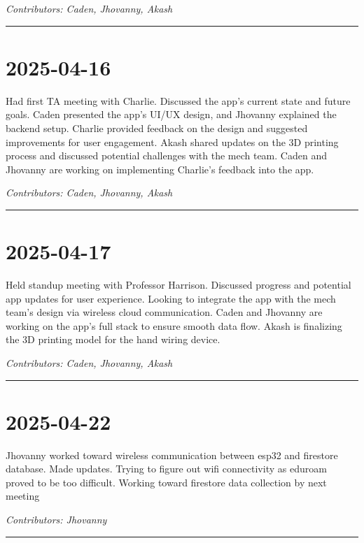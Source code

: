 \documentclass[12pt]{article}
\begin{document}
\vspace{1em}
\noindent\textit{Contributors: Caden, Jhovanny, Akash}
\vspace{1em}
\hrule

\section*{2025-04-16}
Had first TA meeting with Charlie. Discussed the app's current state and future goals. Caden presented the app's UI/UX design, and Jhovanny explained the backend setup. Charlie provided feedback on the design and suggested improvements for user engagement. Akash shared updates on the 3D printing process and discussed potential challenges with the mech team.
Caden and Jhovanny are working on implementing Charlie's feedback into the app. 

\vspace{1em}
\noindent\textit{Contributors: Caden, Jhovanny, Akash}
\vspace{1em}
\hrule

\section*{2025-04-17}
Held standup meeting with Professor Harrison. Discussed progress and potential app updates for user experience. Looking to integrate the app with the mech team's design via wireless cloud communication. Caden and Jhovanny are working on the app's full stack to ensure smooth data flow. Akash is finalizing the 3D printing model for the hand wiring device.

\vspace{1em}
\noindent\textit{Contributors: Caden, Jhovanny, Akash}
\vspace{1em}
\hrule

\section*{2025-04-22}
Jhovanny worked toward wireless communication between esp32 and firestore database. Made updates. Trying to figure out wifi connectivity as eduroam proved to be too difficult. Working toward firestore data collection by next meeting

\vspace{1em}
\noindent\textit{Contributors: Jhovanny}
\vspace{1em}
\hrule
\end{document}
